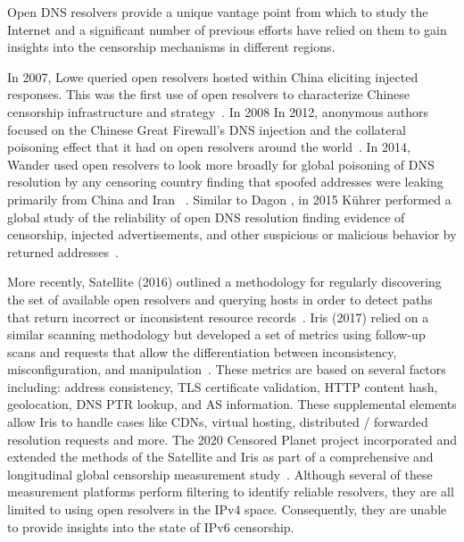 Open DNS resolvers provide a unique vantage point from which to study the
Internet and a significant number of previous efforts have relied on them to
gain insights into the censorship mechanisms in different regions.

In 2007, Lowe \etal queried open resolvers hosted within China eliciting
injected responses. This was the first use of open resolvers to characterize
Chinese censorship infrastructure and strategy~\cite{lowe2007great}. In 2008
In 2012, anonymous authors focused on the Chinese Great Firewall's DNS
injection and the collateral poisoning effect that it had on open resolvers
around the world~\cite{nebuchadnezzar2012collateral}. In 2014, Wander \etal
used open resolvers to look more broadly for global poisoning of DNS resolution
by any censoring country finding that spoofed addresses were leaking primarily
from China and Iran ~\cite{wander2014measurement}. Similar to Dagon \etal, in
2015 K{\"u}hrer \etal performed a global study of the reliability of open DNS
resolution finding evidence of censorship, injected advertisements, and other
suspicious or malicious behavior by returned addresses~\cite{kuhrer2015going}.

More recently, Satellite (2016) outlined a methodology for regularly
discovering the set of available open resolvers and querying hosts in order to
detect paths that return incorrect or inconsistent resource
records~\cite{scott2016satellite}. Iris (2017) relied on a similar scanning
methodology but developed a set of metrics using follow-up scans and requests
that allow the differentiation between inconsistency, misconfiguration, and
manipulation~\cite{pearce2017global}. These metrics are based on several
factors including: address consistency, TLS certificate validation, HTTP
content hash, geolocation, DNS PTR lookup, and AS information. These
supplemental elements allow Iris to handle cases like CDNs, virtual hosting,
distributed / forwarded resolution requests and more. The 2020 Censored Planet
project incorporated and extended the methods of the Satellite and Iris as part
of a comprehensive and longitudinal global censorship measurement
study~\cite{sundara2020censored}. 
%
Although several of these measurement platforms perform filtering to identify
reliable resolvers, they are all limited to using open resolvers in the IPv4
space. Consequently, they are unable to provide insights into the state of IPv6
censorship.

